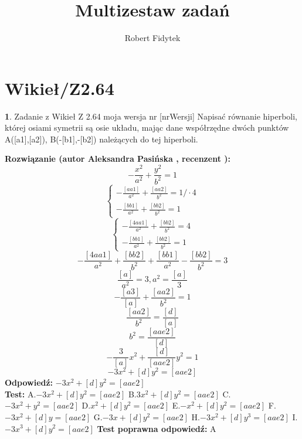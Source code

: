 \documentclass[12pt, a4paper]{article}
\title{Multizestaw zadań}
\author{Robert Fidytek}
\date{}
\theoremstyle{definition} %
\newtheorem{zad}{}
\newcommand{\kategoria}[1]{\section{#1}} %
\newcommand{\zadStart}[1]{\begin{zad}#1\newline} %
\newcommand{\zadStop}{\end{zad}}   %
\newcommand{\rozwStart}[2]{\noindent \textbf{Rozwiązanie (autor #1 , recenzent #2): }\newline} %
\newcommand{\rozwStop}{\newline}                                            %
\newcommand{\odpStart}{\noindent \textbf{Odpowiedź:}\newline}    %
\newcommand{\odpStop}{\newline}                                             %
\newcommand{\testStart}{\noindent \textbf{Test:}\newline} %
\newcommand{\testStop}{\newline} %
\newcommand{\kluczStart}{\noindent \textbf{Test poprawna odpowiedź:}\newline} %
\newcommand{\kluczStop}{\newline} %
\begin{document}
\maketitle


\kategoria{Wikieł/Z2.64}
\zadStart{Zadanie z Wikieł Z 2.64 moja wersja nr [nrWersji]}
Napisać równanie hiperboli, której osiami symetrii są osie układu, mając dane współrzędne dwóch punktów A([a1],[a2]), B(-[b1],-[b2]) należących do tej hiperboli.
\zadStop
\rozwStart{Aleksandra Pasińska}{}
$$-\frac{x^2}{a^2}+\frac{y^2}{b^2}=1$$
$$\left\{ \begin{array}{ll}
-\frac{[aa1]}{a^2}+\frac{[aa2]}{b^2}=1/\cdot4\\
-\frac{[bb1]}{a^2}+\frac{[bb2]}{b^2}=1
\end{array} \right.$$
$$\left\{ \begin{array}{ll}
-\frac{[4aa1]}{a^2}+\frac{[bb2]}{b^2}=4\\
-\frac{[bb1]}{a^2}+\frac{[bb2]}{b^2}=1
\end{array} \right.$$
$$-\frac{[4aa1]}{a^2}+\frac{[bb2]}{b^2}+\frac{[bb1]}{a^2}-\frac{[bb2]}{b^2}=3$$
$$\frac{[a]}{a^2}=3,a^2=\frac{[a]}{3}$$
$$-\frac{[a3]}{[a]}+\frac{[aa2]}{b^2}=1$$
$$\frac{[aa2]}{b^2}=\frac{[d]}{[a]}$$
$$b^2=\frac{[aae2]}{[d]}$$
$$-\frac{3}{[a]}x^2+\frac{[d]}{[aae2]}y^2=1$$
$$-3x^2+[d]y^2=[aae2]$$
\rozwStop
\odpStart
$-3x^2+[d]y^2=[aae2]$\\
\odpStop
\testStart
A.$-3x^2+[d]y^2=[aae2]$
B.$ 3x^2+[d]y^2=[aae2]$
C.$-3x^2+y^2=[aae2]$
D.$x^2+[d]y^2=[aae2]$
E.$-x^2+[d]y^2=[aae2]$
F.$-3x^2+[d]y=[aae2]$
G.$-3x+[d]y^2=[aae2]$
H.$-3x^2+[d]y^3=[aae2]$
I.$-3x^3+[d]y^2=[aae2]$
\testStop
\kluczStart
A
\kluczStop
\end{document}
